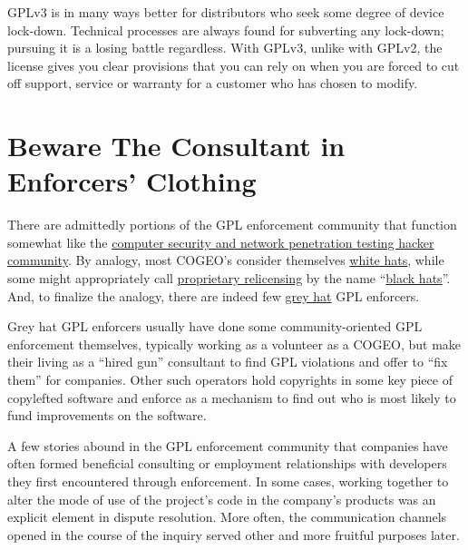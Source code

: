 GPLv3 is in many ways better for distributors who seek some degree of
device lock-down.  Technical processes are always found for subverting any
lock-down; pursuing it is a losing battle regardless.  With GPLv3, unlike
with GPLv2, the license gives you clear provisions that you can rely on
when you are forced to cut off support, service or warranty for a customer
who has chosen to modify.



\section{Beware The Consultant in Enforcers' Clothing}

There are admittedly portions of the GPL enforcement community that function
somewhat like the
\href{http://en.wikipedia.org/wiki/Hacker_%28computer_security%29#Classifications}{computer
  security and network penetration testing hacker community}.  By analogy,
most COGEO's consider themselves
\href{http://en.wikipedia.org/wiki/White_hat_%28computer_security%29}{white hats},
while some might appropriately call
\hyperref[Proprietary Relicensing]{proprietary relicensing} by the name ``\href{http://en.wikipedia.org/wiki/Hacker_%28computer_security%29#Black_hat}{black hats}''.
And, to finalize the analogy, there are indeed few
\href{http://en.wikipedia.org/wiki/Grey_hat}{grey hat} GPL enforcers.

Grey hat GPL enforcers usually have done some community-oriented GPL
enforcement themselves, typically working as a volunteer as a COGEO, but make
their living as a ``hired gun'' consultant to find GPL violations and offer
to ``fix them'' for companies.  Other such operators hold copyrights in some
key piece of copylefted software and enforce as a mechanism to find out who
is most likely to fund improvements on the software.

A few stories abound in the GPL enforcement community that companies have
often formed beneficial consulting or employment relationships with
developers they first encountered through enforcement.  In some cases,
working together to alter the mode of use of the project’s code in the
company’s products was an explicit element in dispute resolution.  More
often, the communication channels opened in the course of the inquiry served
other and more fruitful purposes later.

